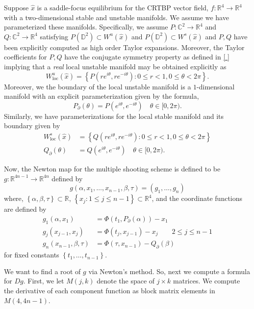 \documentclass[10pt]{article}
\newcommand{\rr}{\mathbb{R}}
\newcommand{\cc}{\mathbb{C}}
\newcommand{\dd}{\mathbb{D}}
\newcommand{\setof}[1]{\left\{#1\right\}}
\begin{document}
Suppose $\hat x$ is a saddle-focus equilibrium for the CRTBP vector field, $f: \rr^4 \to \rr^4$ with a two-dimensional stable and unstable manifolds. We assume we have parameterized these manifolds. Specifically, we assume  $P : \cc^2 \to \rr^4$ and $Q: \cc^2 \to \rr^4$ satisfying $P(\dd^2) \subset W^u(\hat x)$ and $P(\dd^2) \subset W^s(\hat x)$ and $P, Q$ have been explicitly computed as high order Taylor expansions. Moreover, the Taylor coefficients for $P,Q$ have the conjugate symmetry property as defined in \ref{ } implying that a {\em real} local unstable manifold may be obtained explicitly as 
\[
W^u_{\text{loc}}(\hat x) = \setof{P\left(re^{i \theta}, r e^{-i\theta} \right) : 0 \leq r < 1, 0 \leq \theta < 2 \pi}.
\]
Moreover, we the boundary of the local unstable manifold is a $1$-dimensional manifold with an explicit parameterization given by the formula, 
\[
P_{\partial}(\theta) = P(e^{i \theta}, e^{-i \theta}) \quad \theta \in [0, 2\pi).
\]
Similarly, we have parameterizations for the local stable manifold and its boundary given by 
\begin{align*}
W^s_{\text{loc}}(\hat x) &= \setof{Q\left(re^{i \theta}, r e^{-i\theta} \right) : 0 \leq r < 1, 0 \leq \theta < 2 \pi} \\
Q_{\partial}(\theta)& = Q(e^{i \theta}, e^{-i \theta}) \quad \theta \in [0, 2\pi).
\end{align*}

Now, the Newton map for the multiple shooting scheme is defined to be $g: \rr^{4n-1} \to \rr^{4n}$ defined by 
\[
g(\alpha, x_1, \dotsc, x_{n-1}, \beta, \tau) = \left(g_1, \dotsc, g_n\right)
\]
where, $\setof{\alpha, \beta, \tau} \subset \rr$, $\setof{x_j : 1\leq j \leq n-1} \subset \rr^4$, and the coordinate functions are defined by 
\begin{align*}
g_1(\alpha, x_1) & = \Phi\left(t_1, P_\partial(\alpha)\right) - x_1 \\
g_j(x_{j-1}, x_j) & = \Phi \left(t_j, x_{j-1}\right) - x_j \qquad 2 \leq j \leq n-1 \\
g_n(x_{n-1}, \beta, \tau) & = \Phi \left(\tau, x_{n-1}\right) - Q_\partial(\beta)
\end{align*}
for fixed constants $\setof{t_1,\dotsc, t_{n-1}}$.

We want to find a root of $g$ via Newton's method. So, next we compute a formula for $Dg$. First, we let $M(j,k)$ denote the space of $j \times k$ matrices.  We compute the derivative of each component function as block matrix elements in $M(4, 4n-1)$. 
\end{document}

